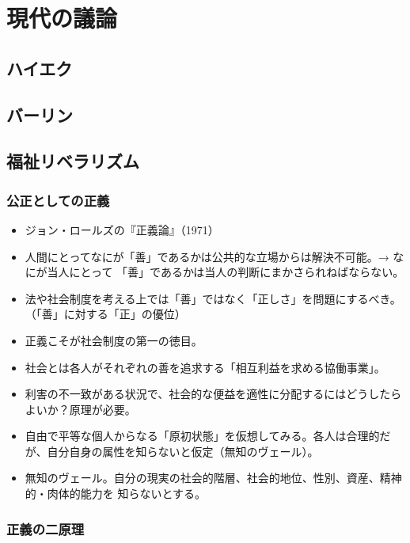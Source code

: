 
\chapter{現代の議論}

\section{ハイエク}


\section{バーリン}






\section{福祉リベラリズム}


\subsection{公正としての正義}
\begin{itemize}
\item ジョン・ロールズの『正義論』（1971）
\item 人間にとってなにが「善」であるかは公共的な立場からは解決不可能。→ なにが当人にとって
「善」であるかは当人の判断にまかさられねばならない。

\item 法や社会制度を考える上では「善」ではなく「正しさ」を問題にするべき。
（「善」に対する「正」の優位）
\item 正義こそが社会制度の第一の徳目。
\item 社会とは各人がそれぞれの善を追求する「相互利益を求める協働事業」。
\item 利害の不一致がある状況で、社会的な便益を適性に分配するにはどうしたらよいか？原理が必要。
\item 自由で平等な個人からなる「原初状態」を仮想してみる。各人は合理的だが、自分自身の属性を知らないと仮定（無知のヴェール）。
\item 無知のヴェール。自分の現実の社会的階層、社会的地位、性別、資産、精神的・肉体的能力を
  知らないとする。
\end{itemize}

\subsection{正義の二原理}

